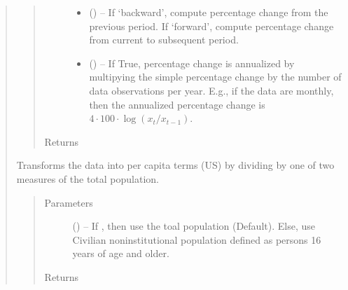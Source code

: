\documentclass[letterpaper,10pt,openany,oneside,english]{sphinxmanual}
\begin{document}
\begin{fulllineitems}
\begin{quote}
\begin{fulllineitems}
\begin{quote}
\begin{description}
\begin{itemize}
\item {} 
 (\href{https://docs.python.org/2/library/string.html\#module-string}{}) -- If `backward', compute percentage change from the previous period. If `forward', compute percentage change from current to subsequent period.

\item {} 
 (\href{https://docs.python.org/2/library/functions.html\#bool}{}) -- If True, percentage change is annualized by multipying the simple percentage change by the number of data observations per year. E.g., if the data are monthly, then the annualized percentage change is \(4\cdot 100\cdot\log(x_{t}/x_{t-1})\).

\end{itemize}

\item[{Returns}] \leavevmode
{\hyperref[\detokenize{series_class:fredpy.series}]{}}

\end{description}\end{quote}

\end{fulllineitems}


\begin{fulllineitems}
\label{\detokenize{series_class:fredpy.series.percapita}}
Transforms the data into per capita terms (US) by dividing by one of two measures of the total population.
\begin{quote}\begin{description}
\item[{Parameters}] \leavevmode
{} (\href{https://docs.python.org/2/library/string.html\#module-string}{}) -- If , then use the toal population (Default). Else, use Civilian noninstitutional population defined as persons 16 years of age and older.

\item[{Returns}] \leavevmode
{\hyperref[\detokenize{series_class:fredpy.series}]{}}

\end{description}\end{quote}


\end{fulllineitems}
\end{quote}
\end{fulllineitems}
\end{document}
